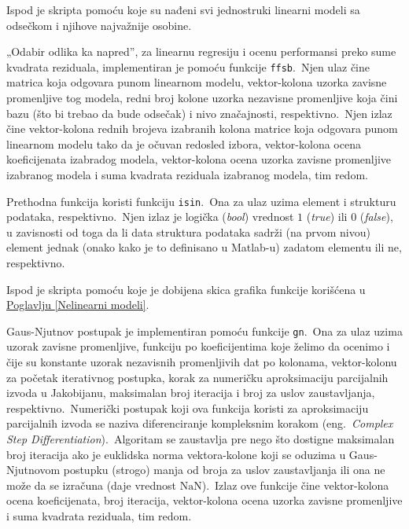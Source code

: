 \documentclass[12pt,a4paper,titlepage,oneside]{article}
\numberwithin{equation}{section}
\numberwithin{figure}{section}
\numberwithin{table}{section}
\theoremstyle{definition}
\theoremstyle{remark}
\begin{document}
\begin{appendices}
Ispod je skripta pomoću koje su nađeni svi jednostruki linearni modeli sa odsečkom i njihove najvažnije osobine.


„Odabir odlika ka napred”, za linearnu regresiju i ocenu performansi preko sume kvadrata reziduala, implementiran je pomoću funkcije \texttt{ffsb}.\ Njen ulaz čine matrica koja odgovara punom linearnom modelu, vektor-kolona uzorka zavisne promenljive tog modela, redni broj kolone uzorka nezavisne promenljive koja čini bazu (što bi trebao da bude odsečak) i nivo značajnosti, respektivno.\ Njen izlaz čine vektor-kolona rednih brojeva izabranih kolona matrice koja odgovara punom linearnom modelu tako da je očuvan redosled izbora, vektor-kolona ocena koeficijenata izabradog modela, vektor-kolona ocena uzorka zavisne promenljive izabranog modela i suma kvadrata reziduala izabranog modela, tim redom.


Prethodna funkcija koristi funkciju \texttt{isin}.\ Ona za ulaz uzima element i strukturu podataka, respektivno.\ Njen izlaz je logička (\textit{bool}) vrednost $1$ (\textit{true}) ili $0$ (\textit{false}), u zavisnosti od toga da li data struktura podataka sadrži (na prvom nivou) element jednak (onako kako je to definisano u Matlab-u) zadatom elementu ili ne, respektivno.


Ispod je skripta pomoću koje je dobijena skica grafika funkcije korišćena u \hyperref[Nelinearni modeli]{Poglavlju \ref*{Nelinearni modeli}}.


Gaus-Njutnov postupak je implementiran pomoću funkcije \texttt{gn}.\ Ona za ulaz uzima uzorak zavisne promenljive, funkciju po koeficijentima koje želimo da ocenimo i čije su konstante uzorak nezavisnih promenljivih dat po kolonama, vektor-kolonu za početak iterativnog postupka, korak za numeričku aproksimaciju parcijalnih izvoda u Jakobijanu, maksimalan broj iteracija i broj za uslov zaustavljanja, respektivno.\ Numerički postupak koji ova funkcija koristi za aproksimaciju parcijalnih izvoda se naziva diferenciranje kompleksnim korakom (eng.\ \textit{Complex Step Differentiation}).\ Algoritam se zaustavlja pre nego što dostigne maksimalan broj iteracija ako je euklidska norma vektora-kolone koji se oduzima u Gaus-Njutnovom postupku (strogo) manja od broja za uslov zaustavljanja ili ona ne može da se izračuna (daje vrednost $\text{NaN}$).\ Izlaz ove funkcije čine vektor-kolona ocena koeficijenata, broj iteracija, vektor-kolona ocena uzorka zavisne promenljive i suma kvadrata reziduala, tim redom.



\end{appendices}
\end{document}
